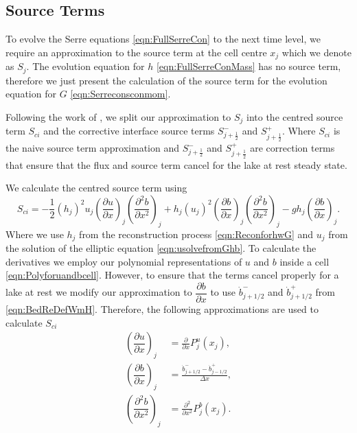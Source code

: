 \subsection{Source Terms}
To evolve the Serre equations \eqref{eqn:FullSerreCon} to the next time level, we require an approximation to the source term at the cell centre $x_j$ which we denote as $S_j$. The evolution equation for $h$ \eqref{eqn:FullSerreConMass} has no source term, therefore we just present the calculation of the source term for the evolution equation for $G$ \eqref{eqn:Serreconsconmom}.

Following the work of \citet{Klein-etal-2004-2050}, we split our approximation to $S_j$ into the centred source term $S_{ci}$ and the corrective interface source terms $S^{-}_{j + \frac{1}{2}}$ and $S^{+}_{j + \frac{1}{2}}$.
Where $S_{ci}$ is the naive source term approximation and $S^{-}_{j + \frac{1}{2}}$ and $S^{+}_{j + \frac{1}{2}}$ are correction terms that ensure that the flux and source term cancel for the lake at rest steady state. 

We calculate the centred source term using
\begin{equation*}
 S_{ci} = -\frac{1}{2}\left(h_j\right)^2 {u_j}\left( \frac{\partial {u}}{\partial x} \right)_j \left(\frac{\partial^2 b}{\partial x^2} \right)_j  + h_j \left(u_j\right)^2 \left(\frac{\partial b}{\partial x}\right)_j \left(\frac{\partial^2 b}{\partial x^2}\right)_j - gh_j\left(\frac{\partial b}{\partial x}\right)_j.
\end{equation*}
Where we use $h_j$ from the reconstruction process \eqref{eqn:ReconforhwG} and $u_j$ from the solution of the elliptic equation \eqref{eqn:usolvefromGhb}. To calculate the derivatives we employ our polynomial representations of $u$ and $b$ inside a cell \eqref{eqn:Polyforuandbcell}. However, to ensure that the terms cancel properly for a lake at rest we modify our approximation to $\dfrac{\partial b}{\partial x}$ to use $\dot{b}^-_{j+1/2}$ and $\dot{b}^+_{j+1/2}$ from \eqref{eqn:BedReDefWmH}. Therefore, the following approximations are used to calculate $S_{ci}$
\begin{subequations}
	\begin{align}
	\left(\dfrac{\partial {u}}{\partial x} \right)_{j} &= \frac{\partial }{\partial x}P^u_j(x_{j}),  \\
\left(\dfrac{\partial {b}}{\partial x} \right)_{j} &=  \frac{\dot{b}^-_{j+1/2} - \dot{b}^+_{j-1/2}}{\Delta x} , \\	
	\left(\dfrac{\partial^2 {b}}{\partial x^2} \right)_{j} &= \frac{\partial^2 }{\partial x^2}P^b_j(x_{j}).
	\end{align}
	\label{eqn:dbduReconSource}
\end{subequations}

